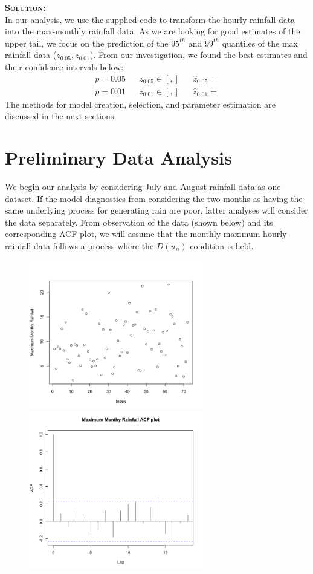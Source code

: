 \documentclass[12pt,oneside]{article}
\newenvironment{solution}
    {\textbf{\textsc{Solution:}}\\}
    {\newpage}
\begin{document}
\begin{solution}
In our analysis, we use the supplied code to transform the hourly rainfall data into the max-monthly rainfall data. As we are looking for good estimates of the upper tail, we focus on the prediction of the $95^{th}$ and $99^{th}$ quantiles of the max rainfall data ($z_{0.05},z_{0.01}$). From our investigation, we found the best estimates and their confidence intervals below:
\begin{align*}
    p= 0.05 &&z_{0.05}\in [ , ] && \hat{z}_{0.05}= \\
    p= 0.01 &&z_{0.01}\in [ , ] && \hat{z}_{0.01}= 
\end{align*}
The methods for model creation, selection, and parameter estimation are discussed in the next sections.
\section*{Preliminary Data Analysis}
We begin our analysis by considering July and August rainfall data as one dataset. If the model diagnostics from considering the two months as having the same underlying process for generating rain are poor, latter analyses will consider the data separately. From observation of the data (shown below) and its corresponding ACF plot, we will assume that the monthly maximum hourly rainfall data follows a process where the $D(u_n)$ condition is held. 
\begin{figure}[H]
\begin{center}
{\includegraphics[width=3in]{Assignments/a3/rain.png}}
{\includegraphics[width=3in]{Assignments/a3/rain-acf.png}}

\end{center}
\end{figure}
\end{solution}
\end{document}

